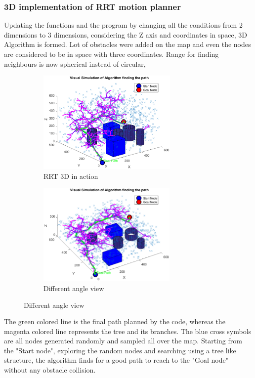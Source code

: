 \documentclass[12pt]{article}
\begin{document}
\subsubsection{3D implementation of RRT motion planner}
Updating the functions and the program by changing all the conditions from 2 dimensions to 3 dimensions, considering the Z axis and coordinates in space, 3D Algorithm is formed. Lot of obstacles were added on the map and even the nodes are considered to be in space with three coordinates. Range for finding neighbours is now spherical instead of circular,      

\begin{figure}[H]
\begin{subfigure}{0.5\textwidth}
\includegraphics[width=0.8\linewidth, height=5cm]{RRT_LARGERTREE_RUN.eps}
\captionsetup{labelformat=empty}
\caption{RRT 3D in action}
\end{subfigure}
\begin{subfigure}{0.5\textwidth}
\includegraphics[width=0.8\linewidth, height=5cm]{RRT_LARGERTREE_RUN_VIEW.eps}
\captionsetup{labelformat=empty}
\caption{Different angle view}
\end{subfigure}
\end{figure}
The green colored line is the final path planned by the code, whereas the magenta colored line represents the tree and its branches. The blue cross symbols are all nodes generated randomly and sampled all over the map. Starting from the "Start node", exploring the random nodes and searching using a tree like structure, the algorithm finds for a good path to reach to the "Goal node" without any obstacle collision. 
\end{document}
